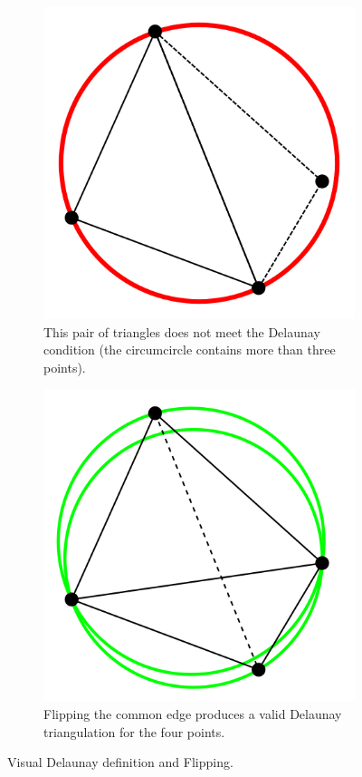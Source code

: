 \begin{figure}[htbp]
    \begin{subfigure}[b]{\subfigwidth}
        \centering
        \includegraphics[width=\subfigwidth]{figures/appendix/Point_inside_circle_-_Delaunay_condition_broken.png}
        \caption{This pair of triangles does not meet the Delaunay condition (the circumcircle contains more than three points).}\label{subfig:delauneyflip}
    \end{subfigure}

    \begin{subfigure}[b]{\subfigwidth}
        \centering
        \includegraphics[width=\subfigwidth]{figures/appendix/Edge_Flip_-_Delaunay_condition_ok.png}
        \caption{Flipping the common edge produces a valid Delaunay triangulation for the four points.}\label{subfig:delauneyfix}
    \end{subfigure}
    \caption{Visual Delaunay definition and Flipping.}\label{fig:delauneyflip}
\end{figure}
